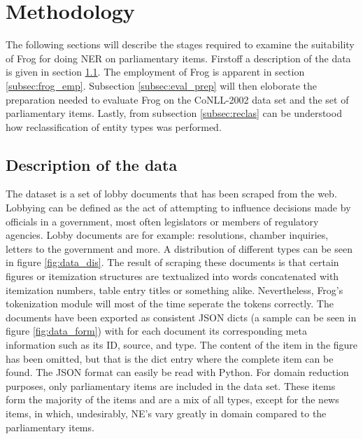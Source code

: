 \section{Methodology}
\label{sec:meth}
The following sections will describe the stages required to examine the suitability of Frog for doing NER on parliamentary items. Firstoff a description of the data is given in section \ref{subsec:data}. The employment of Frog is apparent in section \ref{subsec:frog_emp}. Subsection \ref{subsec:eval_prep} will then eloborate the preparation needed to evaluate Frog on the CoNLL-2002 data set and the set of parliamentary items. Lastly, from subsection \ref{subsec:reclas} can be understood how reclassification of entity types was performed. 

\subsection{Description of the data}\label{subsec:data}


The dataset is a set of lobby documents that has been scraped from the web. Lobbying can be defined as the act of attempting to influence decisions made by officials in a government, most often legislators or members of regulatory agencies. Lobby documents are for example: resolutions, chamber inquiries, letters to the government and more. A distribution of different types can be seen in figure \ref{fig:data_dis}. The result of scraping these documents is that certain figures or itemization structures are textualized into words concatenated with itemization numbers, table entry titles or something alike. Nevertheless, Frog's tokenization module will most of the time seperate the tokens correctly.  The documents have been exported as consistent JSON dicts (a sample can be seen in figure \ref{fig:data_form}) with for each document its corresponding meta information such as its ID, source, and type. The content of the item in the figure has been omitted, but that is the dict entry where the complete item can be found. The JSON format can easily be read with Python. For domain reduction purposes, only parliamentary items are included in the data set. These items form the majority of the items and are a mix of all types, except for the news items, in which, undesirably, NE's vary greatly in domain compared to the parliamentary items.

